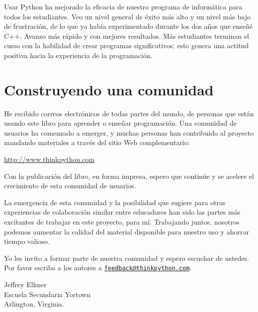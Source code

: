 Usar Python ha mejorado la eficacia de nuestro programa de informática
para todos los estudiantes. Veo un nivel general de éxito más alto
y un nivel más bajo de frustración, de lo que ya había experimentado
durante los dos años que enseñé C++. Avanzo más rápido y con mejores
resultados. Más estudiantes terminan el curso con la habilidad de
crear programas significativos; esto genera una actitud positiva hacia
la experiencia de la programación.

\section*{Construyendo una comunidad}

He recibido correos electrónicos de todas partes del mundo, de personas
que están usando este libro para aprender o enseñar programación.
Una comunidad de usuarios ha comenzado a emerger, y muchas personas
han contribuido al proyecto mandando materiales a través del sitio
Web complementario:

\begin{center}
	\url{http://www.thinkpython.com}
\end{center}

Con la publicación del libro, en forma impresa, espero que continúe
y se acelere el crecimiento de esta comunidad de usuarios.

La emergencia de esta comunidad y la posibilidad que sugiere para
otras experiencias de colaboración similar entre educadores han sido
las partes más excitantes de trabajar en este proyecto, para mí. Trabajando
juntos, nosotros podemos aumentar la calidad del material disponible
para nuestro uso y ahorrar tiempo valioso.

Yo les invito a formar parte de nuestra comunidad y espero escuchar
de ustedes. Por favor escriba a los autores a \texttt{\url{feedback@thinkpython.com}}.

\vspace{0.25in}
 
\begin{flushleft}
Jeffrey Elkner\\
Escuela Secundaria Yortown\\
Arlington, Virginia.\\
\par
\end{flushleft}